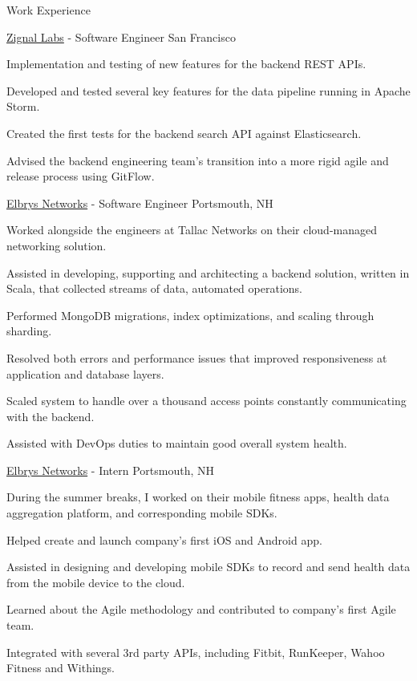 \documentclass[UKenglish]{resume} %
\begin{document}
\begin{rSection}{Work Experience}
    \begin{rSubsection}
        {\href{https://www.zignallabs.com}{Zignal Labs}}
        {  -  }
        {Software Engineer}
        {San Francisco}
        \item Implementation and testing of new features for the backend REST APIs.
        \item Developed and tested several key features for the data pipeline running in Apache Storm.
        \item Created the first tests for the backend search API against Elasticsearch.
        \item Advised the backend engineering team's transition into a more rigid agile and release process using GitFlow.
    \end{rSubsection}


    \begin{rSubsection}
        {\href{}{Elbrys Networks}}
        {  -  }
        {Software Engineer}
        {Portsmouth, NH}

        \item Worked alongside the engineers at Tallac Networks on their cloud-managed networking solution. 
        \item Assisted in developing, supporting and architecting a backend solution, written in Scala, that collected streams of data, automated operations.
        \item Performed MongoDB migrations, index optimizations, and scaling through sharding.
        \item Resolved both errors and performance issues that improved responsiveness at application and database layers.
        \item Scaled system to handle over a thousand access points constantly communicating with the backend.
        \item Assisted with DevOps duties to maintain good overall system health.

    \end{rSubsection}

    \begin{rSubsection}
        {\href{}{Elbrys Networks}}
        {  -  }
        {Intern}
        {Portsmouth, NH}

        \item During the summer breaks, I worked on their mobile fitness apps, health data aggregation platform, and corresponding mobile SDKs.
        \item Helped create and launch company’s first iOS and Android app.
        \item Assisted in designing and developing mobile SDKs to record and send health data from the mobile device to the cloud.
        \item Learned about the Agile methodology and contributed to company's first Agile team.
        \item Integrated with several 3rd party APIs, including Fitbit, RunKeeper, Wahoo Fitness and Withings.
    \end{rSubsection}


\end{rSection}
\end{document}
